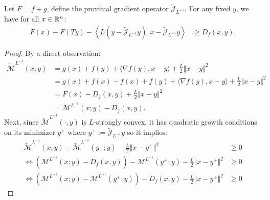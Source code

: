 \documentclass[12pt]{article}
\begin{document}
    \begin{theorem}
    \label{app:thm:fun-thm-prox-grad}
        Let $F = f + g$, define the proximal gradient operator $\widetilde{\mathcal J}_{L^{-1}}$.  
        For any fixed $y$, we have for all $x \in \mathbb R^n$: 
        \begin{align*}
            F(x) - F(Ty) - 
            \left\langle 
                L(y - \widetilde{\mathcal J}_{L^{-1}} y),
                x - \widetilde {\mathcal J}_{L^{-1}}y
            \right\rangle
            &\ge  D_f(x, y) . 
        \end{align*}  
    \end{theorem}
    \begin{proof}
        By a direct observation: 
        \begin{align*}
            \widetilde{\mathcal M}^{L^{-1}}(x; y) 
            &= 
            g(x) + f(y) + \langle \nabla f(y), x - y\rangle + \frac{L}{2}\Vert x - y\Vert^2
            \\
            &= 
            g(x) + f(x) - f(x) + f(y) 
            + \langle \nabla f(y), x - y\rangle + \frac{L}{2}\Vert x - y\Vert^2
            \\
            &= 
            F(x) - D_f(x, y) + \frac{L}{2}\Vert x - y\Vert^2 
            \\
            &= \mathcal M^{L^{-1}}(x; y) - D_f(x, y). 
        \end{align*}
        Next, since $\widetilde{\mathcal M}^{L^{-1}}(\cdot, y)$ is $L$-strongly convex, it has quadratic growth conditions on its minimizer $y^+$ where $y^+ := \widetilde{\mathcal J}_{L^{-1}}y$ so it implies:
        {\small
        \begin{align*}
            \widetilde{\mathcal M}^{L^{-1}}(x; y) - 
            \widetilde{\mathcal M}^{L^{-1}}(y^+; y)
            - 
            \frac{L}{2}\Vert x - y^+\Vert^2
            &\ge 
            0
            \\
            \iff
            \left(
                \mathcal M^{L^{-1}}(x; y) - D_f(x, y)
            \right) - 
            \mathcal M^{L^{-1}}(y^+; y) 
            - 
            \frac{L}{2}\Vert x - y^+\Vert^2
            &\ge 0
            \\
            \iff 
            \left(
                \mathcal M^{L^{-1}}(x; y)
                - 
                \mathcal M^{L^{-1}}(y^+; y)
            \right)
            - 
            D_f(x, y) 
            - \frac{L}{2}\Vert x - y^+\Vert^2
            &\ge 0

\end{align*}}
\end{proof}
\end{document}
